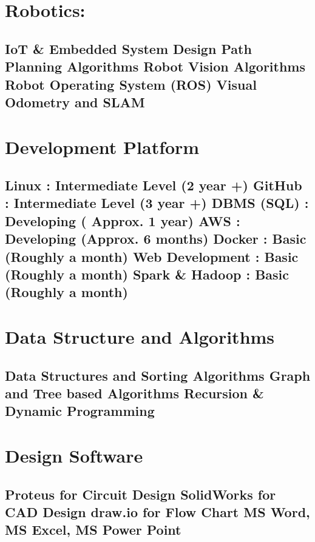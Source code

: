 \documentclass[letterpaper]{twentysecondcv} %
\begin{document}
{\section{\large Robotics:}\subsection{\small  
\textbf{IoT \& Embedded System Design} 
\newline Path Planning Algorithms 
\newline Robot Vision Algorithms 
\newline Robot Operating System \textbf{(ROS)}
\newline \textbf{Visual Odometry and SLAM}}

\section{\large Development Platform} \subsection{\small \textbf{Linux} : Intermediate Level (2 year +) \newline \textbf{GitHub} : Intermediate Level (3 year +) \newline DBMS (SQL) : Developing ( Approx. 1 year)  
\newline AWS : Developing (Approx. 6 months)  
\newline Docker : Basic (Roughly a month)
\newline Web Development : Basic (Roughly a month)
\newline Spark \& Hadoop : Basic (Roughly a month) }

\section{\large Data Structure and Algorithms  }\subsection {\small Data Structures and Sorting Algorithms \newline Graph and Tree based Algorithms \newline Recursion \& Dynamic Programming }

\section{\large Design Software} \subsection{\small Proteus for Circuit Design \newline SolidWorks for CAD Design \newline draw.io for Flow Chart \newline MS Word, MS Excel, MS Power Point}

}
\end{document}
